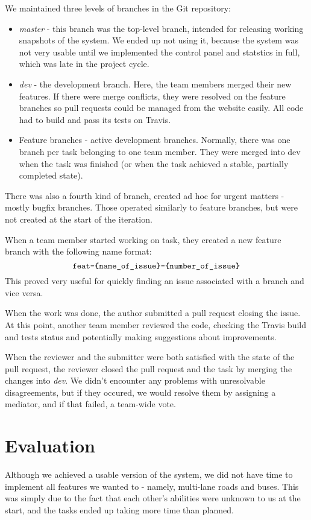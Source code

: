 \documentclass[a4paper,12pt]{article}
\begin{document}
We maintained three levels of branches in the Git repository:
\begin{itemize}
    \item \emph{master} - this branch was the top-level branch, intended for releasing working snapshots of the system. We ended up not using it, because the system was not very usable until we implemented the control panel and statstics in full, which was late in the project cycle.
    \item \emph{dev} - the development branch. Here, the team members merged their new features. If there were merge conflicts, they were resolved on the feature branches so pull requests could be managed from the website easily. All code had to build and pass its tests on Travis.
    \item Feature branches - active development branches. Normally, there was one branch per task belonging to one team member. They were merged into dev when the task was finished (or when the task achieved a stable, partially completed state).
\end{itemize}

There was also a fourth kind of branch, created ad hoc for urgent matters - mostly bugfix branches. Those operated similarly to feature branches, but were not created at the start of the iteration.

When a team member started working on task, they created a new feature branch with the following name format: 
$$\verb|feat-{name_of_issue}-{number_of_issue}|$$ This proved very useful for quickly finding an issue associated with a branch and vice versa.

When the work was done, the author submitted a pull request closing the issue. At this point, another team member reviewed the code, checking the Travis build and tests status and potentially making suggestions about improvements.

When the reviewer and the submitter were both satisfied with the state of the pull request, the reviewer closed the pull request and the task by merging the changes into \emph{dev}. We didn't encounter any problems with unresolvable disagreements, but if they occured, we would resolve them by assigning a mediator, and if that failed, a team-wide vote.

\section{Evaluation}

Although we achieved a usable version of the system, we did not have time to implement all features we wanted to - namely, multi-lane roads and buses. This was simply due to the fact that each other's abilities were unknown to us at the start, and the tasks ended up taking more time than planned.
\end{document}
